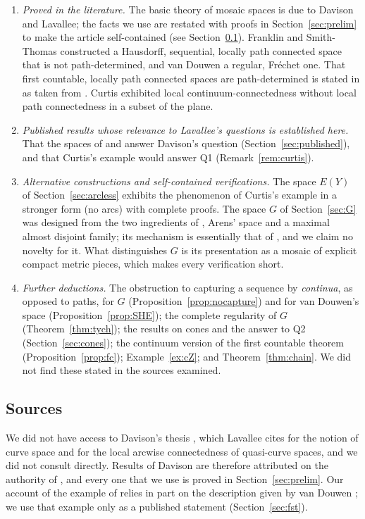 \documentclass[11pt]{amsart}
\theoremstyle{definition}
\theoremstyle{remark}
\numberwithin{equation}{section}
\begin{document}
\begin{enumerate}[label=(\arabic*),leftmargin=2em]
\item \emph{Proved in the literature.} The basic theory of mosaic spaces is due to Davison and Lavallee; the facts we use are restated with proofs in Section~\ref{sec:prelim} to make the article self-contained (see Section~\ref{sec:sources}). Franklin and Smith-Thomas \cite{fst79} constructed a Hausdorff, sequential, locally path connected space that is not path-determined, and van Douwen \cite{vandouwen81} a regular, Fr\'echet one. That first countable, locally path connected spaces are path-determined is stated in \cite{vandouwen81} as taken from \cite{fst79}. Curtis \cite{curtis80} exhibited local continuum-connectedness without local path connectedness in a subset of the plane.
\item \emph{Published results whose relevance to Lavallee's questions is established here.} That the spaces of \cite{fst79} and \cite{vandouwen81} answer Davison's question (Section~\ref{sec:published}), and that Curtis's example would answer Q1 (Remark~\ref{rem:curtis}).
\item \emph{Alternative constructions and self-contained verifications.} The space $E(Y)$ of Section~\ref{sec:arcless} exhibits the phenomenon of Curtis's example in a stronger form (no arcs) with complete proofs. The space $G$ of Section~\ref{sec:G} was designed from the two ingredients of \cite{fst79}, Arens' space and a maximal almost disjoint family; its mechanism is essentially that of \cite{vandouwen81}, and we claim no novelty for it. What distinguishes $G$ is its presentation as a mosaic of explicit compact metric pieces, which makes every verification short.
\item \emph{Further deductions.} The obstruction to capturing a sequence by \emph{continua}, as opposed to paths, for $G$ (Proposition~\ref{prop:nocapture}) and for van Douwen's space (Proposition~\ref{prop:SHE}); the complete regularity of $G$ (Theorem~\ref{thm:tych}); the results on cones and the answer to Q2 (Section~\ref{sec:cones}); the continuum version of the first countable theorem (Proposition~\ref{prop:fc}); Example~\ref{ex:cZ}; and Theorem~\ref{thm:chain}. We did not find these stated in the sources examined.
\end{enumerate}

\subsection{Sources}\label{sec:sources}
We did not have access to Davison's thesis \cite{davison56}, which Lavallee cites for the notion of curve space and for the local arcwise connectedness of quasi-curve spaces, and we did not consult \cite{davison59} directly. Results of Davison are therefore attributed on the authority of \cite{lavallee64}, and every one that we use is proved in Section~\ref{sec:prelim}. Our account of the example of \cite{fst79} relies in part on the description given by van Douwen \cite[pp.~423--424]{vandouwen81}; we use that example only as a published statement (Section~\ref{sec:fst}).
\end{document}
